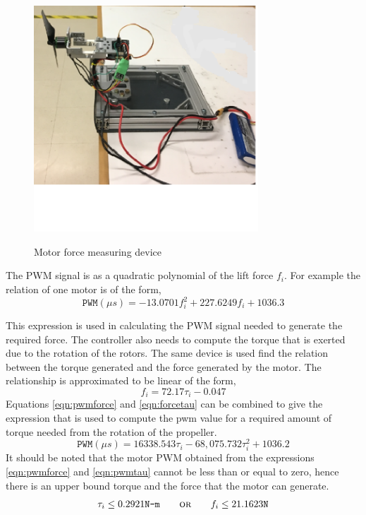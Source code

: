 \documentclass[letterpaper%
, twoside%
, 12pt%
,memoire%
, english%
,creativecommons,hyperref%
]{thETS}
\begin{document}
\begin{figure}
	\centering
	\includegraphics[width=0.75\textwidth,height=0.50\textwidth]{Figures/quad/rcd_c2.eps}
	 \\ \parbox{0.75\textwidth}{\caption{Motor force measuring device \citep{RN121}}\label{rcd_c2}} 
\end{figure}
The PWM signal is as a quadratic polynomial of the lift force $f_i$. For example the relation of one motor is of the form, 
\begin{equation} \label{eqn:pwmforce}
\texttt{PWM} (\mu s)= -13.0701f_i^2+227.6249f_i +1036.3
\end{equation}

This expression is used in calculating the PWM signal needed to generate the required force. The controller also needs to compute the torque that is exerted due to the rotation of the rotors. The same device is used find the relation between the torque generated and the force generated by the motor. The relationship is approximated to be linear of the form, 
\begin{equation} \label{eqn:forcetau}
f_i=72.17\tau_i-0.047
\end{equation}
Equations \eqref{eqn:pwmforce} and \eqref{eqn:forcetau} can be combined to give the expression that is used to compute the pwm value for a required amount of torque needed from the rotation of the propeller. 
\begin{equation} \label{eqn:pwmtau}
\texttt{PWM} (\mu s)= 16338.543\tau_i -68,075.732\tau_i^2 +1036.2
\end{equation}
It should be noted that the motor PWM obtained from the expressions \eqref{eqn:pwmforce} and \eqref{eqn:pwmtau} cannot be less than or equal to zero, hence there is an upper bound torque and the force that the motor can generate. 
\begin{align*}
\tau_i \leq 0.2921\texttt{N-m} \qquad \textsc{or}\qquad f_i \leq  21.1623\texttt{N}
\end{align*}
\end{document}
